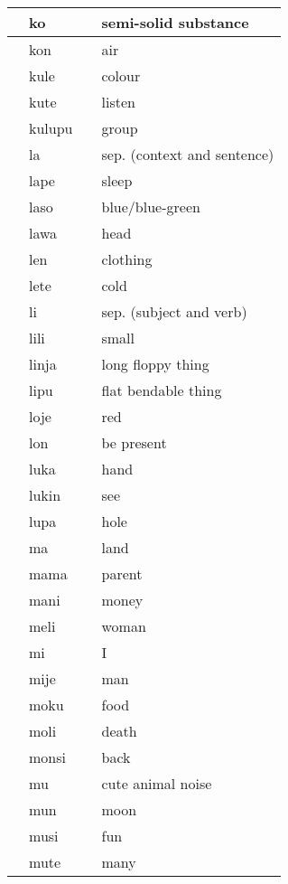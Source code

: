 \begin{table}
\begin{tabular}{|l|l|l|l|}
         & ko &  & semi-solid substance \\ \hline
         & kon &  & air \\ \hline
         & kule &  & colour \\ \hline
         & kute &  & listen \\ \hline
         & kulupu &  & group \\ \hline
         & la &  & sep. (context and sentence) \\ \hline
         & lape &  & sleep \\ \hline
        ️ & laso &  & blue/blue-green \\ \hline
         & lawa &  & head \\ \hline
         & len &  & clothing \\ \hline
        ️ & lete &  & cold \\ \hline
         & li &  & sep. (subject and verb) \\ \hline
         & lili &  & small \\ \hline
        ️ & linja &  & long floppy thing \\ \hline
         & lipu &  & flat bendable thing \\ \hline
         & loje &  & red \\ \hline
         & lon &  & be present \\ \hline
         & luka &  & hand \\ \hline
         & lukin &  & see \\ \hline
        ️ & lupa &  & hole \\ \hline
         & ma &  & land \\ \hline
         & mama &  & parent \\ \hline
         & mani &  & money \\ \hline
         & meli &  & woman \\ \hline
         & mi &  & I \\ \hline
         & mije &  & man \\ \hline
         & moku &  & food \\ \hline
         & moli &  & death \\ \hline
         & monsi &  & back \\ \hline
         & mu &  & cute animal noise \\ \hline
         & mun &  & moon \\ \hline
         & musi &  & fun \\ \hline
         & mute &  & many \\ \hline

\end{tabular}
\end{table}
